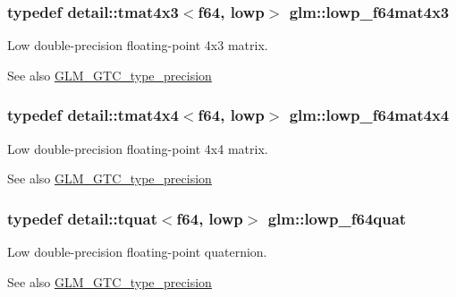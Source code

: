 \subsubsection[{\texorpdfstring{lowp\+\_\+f64mat4x3}{lowp_f64mat4x3}}]{\setlength{\rightskip}{0pt plus 5cm}typedef detail\+::tmat4x3$<$f64, lowp$>$ {\bf glm\+::lowp\+\_\+f64mat4x3}}\hypertarget{group__gtc__type__precision_ga05dba0f9d45301c7b10a9276c60b8a0e}{}\label{group__gtc__type__precision_ga05dba0f9d45301c7b10a9276c60b8a0e}
Low double-\/precision floating-\/point 4x3 matrix. \begin{DoxySeeAlso}{See also}
\hyperlink{group__gtc__type__precision}{G\+L\+M\+\_\+\+G\+T\+C\+\_\+type\+\_\+precision} 
\end{DoxySeeAlso}
\subsubsection[{\texorpdfstring{lowp\+\_\+f64mat4x4}{lowp_f64mat4x4}}]{\setlength{\rightskip}{0pt plus 5cm}typedef detail\+::tmat4x4$<$f64, lowp$>$ {\bf glm\+::lowp\+\_\+f64mat4x4}}\hypertarget{group__gtc__type__precision_gab7d0922ed8d93ee3ce995858feb41231}{}\label{group__gtc__type__precision_gab7d0922ed8d93ee3ce995858feb41231}
Low double-\/precision floating-\/point 4x4 matrix. \begin{DoxySeeAlso}{See also}
\hyperlink{group__gtc__type__precision}{G\+L\+M\+\_\+\+G\+T\+C\+\_\+type\+\_\+precision} 
\end{DoxySeeAlso}
\subsubsection[{\texorpdfstring{lowp\+\_\+f64quat}{lowp_f64quat}}]{\setlength{\rightskip}{0pt plus 5cm}typedef detail\+::tquat$<$f64, lowp$>$ {\bf glm\+::lowp\+\_\+f64quat}}\hypertarget{group__gtc__type__precision_ga225e6f95dd6a7049b1a86db23b90cbac}{}\label{group__gtc__type__precision_ga225e6f95dd6a7049b1a86db23b90cbac}
Low double-\/precision floating-\/point quaternion. \begin{DoxySeeAlso}{See also}
\hyperlink{group__gtc__type__precision}{G\+L\+M\+\_\+\+G\+T\+C\+\_\+type\+\_\+precision} 
\end{DoxySeeAlso}
